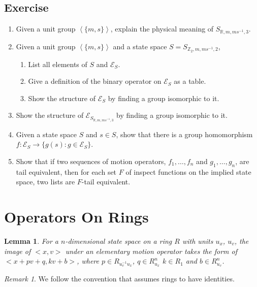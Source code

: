 \documentclass{book}
\newtheorem{lemma}{Lemma}
\theoremstyle{definition}\newtheorem{mechanism}{Mechanism}
\theoremstyle{remark}\newtheorem*{remark}{Remark}
\begin{document}
\subsection*{Exercise}

\begin{enumerate}
	\item Given a unit group $\left<\{m , s\}\right>$, explain the physical meaning of $S_{\mathbb R, m, ms^{-1}, 3}$.
	\item Given a unit group $\left<\{m , s\}\right>$ and a state space $S = S_{\mathbb Z_2, m, ms^{-1}, 2}$, 
	\begin{enumerate}
		\item List all elements of $S$ and $\mathcal E_{S}$.
		\item Give a definition of the binary operator on $\mathcal E_{S}$ as a table.
		\item Show the structure of $\mathcal E_{S}$ by finding a group isomorphic to it.
	\end{enumerate}
	\item Show the structure of $\mathcal E_{S_{\mathbb R, m, ms^{-1}, 3}}$ by finding a group isomorphic to it.
	\item Given a state space $S$ and $s\in S$, show that there is a group homomorphism $f: \mathcal E_{S} \to \{g(s): g\in \mathcal E_S\}$.
	\item Show that if two sequences of motion operators, $f_1, \dots, f_n$ and $g_1, \dots, g_n$, are tail equivalent, then for each set $F$ of inspect functions on the implied state space, two lists are $F$-tail equivalent. 
\end{enumerate}


\section{Operators On Rings}

\begin{lemma}\label{lmm:elem-im-form}
	For a $n$-dimensional state space on a ring $R$ with units $u_x$, $u_v$, the image of $<x, v>$ under an elementary motion operator takes the form of $<x + pv + q, kv + b>$, where $p \in R_{u_v^{-1}u_x}$, $q \in R_{u_x}^n$ $k\in R_{1}$ and $b\in R_{u_v}^n$.
\end{lemma}

\begin{remark}
	We follow the convention that assumes rings to have identities.
\end{remark}
\end{document}
